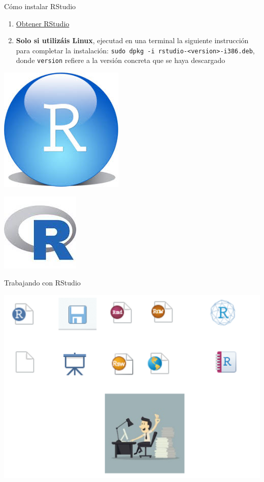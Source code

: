 \documentclass[
  ignorenonframetext,
  aspectratio=169]{beamer}
\providecommand{\tightlist}{%
  \setlength{\itemsep}{0pt}\setlength{\parskip}{0pt}}
\begin{document}
\begin{frame}[fragile]{Cómo instalar RStudio}
\label{cuxf3mo-instalar-rstudio}
\begin{enumerate}
\tightlist
\item
  \href{http://www.rstudio.com/products/rstudio/download/}{Obtener
  RStudio}
\item
  \textbf{Solo si utilizáis Linux}, ejecutad en una terminal la
  siguiente instrucción para completar la instalación:
  \texttt{sudo\ dpkg\ -i\ rstudio-\textless{}version\textgreater{}-i386.deb},
  donde \texttt{version} refiere a la versión concreta que se haya
  descargado
\end{enumerate}

\begin{center}\includegraphics[width=0.25\linewidth]{Imgs/RSLogo} \end{center}

\begin{center}\includegraphics[width=0.25\linewidth]{Imgs/Rlogo} \end{center}
\end{frame}

\begin{frame}{Trabajando con RStudio}
\label{trabajando-con-rstudio}
\begin{center}\includegraphics[width=0.6\linewidth]{Imgs/easy_plus_tools} \end{center}
\end{frame}
\end{document}
